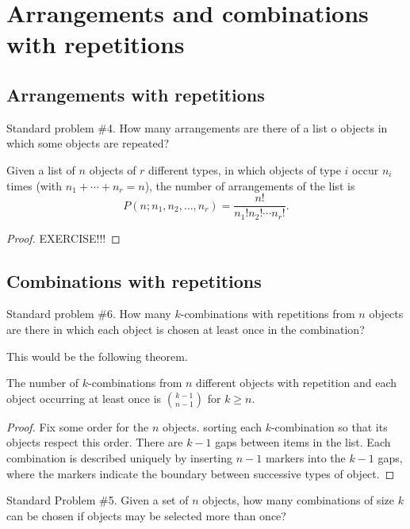 \documentclass[10pt, a4paper]{article}
\begin{document}
\newpage

\section{Arrangements and combinations with repetitions}

\subsection{Arrangements with repetitions}
Standard problem \#4.
How many arrangements are there of a list o objects in which some objects are repeated?

\begin{theorem}
    Given a list of $n$ objects of $r$ different types, in which objects of type $i$ occur $n_i$ times (with $n_1 + \dotsi + n_r = n$), the number of arrangements of the list is
    \[
    P(n; n_1, n_2, \dotsc, n_r) = \frac{n!}{n_1!n_2! \dotsi n_r!}.
    \]
    \begin{proof}
        EXERCISE!!!
    \end{proof}
\end{theorem}

\subsection{Combinations with repetitions}
Standard problem \#6.
How many $k$-combinations with repetitions from $n$ objects are there in which each object is chosen at least once in the combination?

This would be the following theorem.
\begin{theorem}
    The number of $k$-combinations from $n$ different objects with repetition and each object occurring at least once is $\binom{k - 1}{n - 1}$ for $k \geq n$.
    \begin{proof}
        Fix some order for the $n$ objects.
        sorting each $k$-combination so that its objects respect this order.
        There are $k - 1$ gaps between items in the list.
        Each combination is described uniquely by inserting $n - 1$ markers into the $k - 1$ gaps,
        where the markers indicate the boundary between successive types of object.
    \end{proof}
\end{theorem}

Standard Problem \#5.
Given a set of $n$ objects,
how many combinations of size $k$ can be chosen if objects may be selected more than once?
\end{document}

